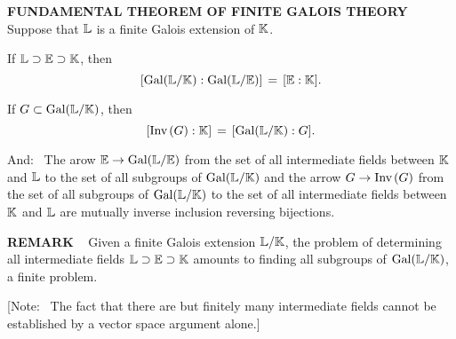 \begin{x}{\small\bf FUNDAMENTAL THEOREM OF FINITE GALOIS THEORY}  \ %
Suppose that $\mathbb{L}$ is a finite Galois extension of $\mathbb{K}$.

\vspace{0.1cm}

\qquad \textbullet \quad If $\mathbb{L} \supset \mathbb{E} \supset \mathbb{K}$, then
\[
[\text{Gal}(\mathbb{L}/\mathbb{K}):\text{Gal}(\mathbb{L}/\mathbb{E})] \hspace{0.05cm} = \hspace{0.05cm}  [\mathbb{E}:\mathbb{K}].
\]
\vspace{0.1cm}

\qquad \textbullet \quad If $G \subset \text{Gal}(\mathbb{L}/\mathbb{K})$, then 
\[
[\text{Inv}\hspace{0.05cm}(G):\mathbb{K}] \hspace{0.05cm} = \hspace{0.05cm} [\text{Gal}(\mathbb{L}/\mathbb{K}):G].
\]

\vspace{0.1cm}

And: \ The arow $\mathbb{E} \rightarrow \text{Gal}(\mathbb{L}/\mathbb{E})$ from the set of all intermediate fields between $\mathbb{K}$ and $\mathbb{L}$ 
to the set of all subgroups of $\text{Gal}(\mathbb{L}/\mathbb{K})$ and the arrow $G \rightarrow \text{Inv}\hspace{0.05cm}(G)$ from the 
set of all subgroups of $\text{Gal}(\mathbb{L}/\mathbb{K})$ to the set of all intermediate fields between $\mathbb{K}$ and $\mathbb{L}$ 
are mutually inverse inclusion reversing bijections.
\end{x}

\vspace{0.1cm}

\begin{x}{\small\bf REMARK} \ %
Given a finite Galois extension $\mathbb{L}/\mathbb{K}$, the problem of determining all intermediate fields 
$\mathbb{L} \supset \mathbb{E} \supset \mathbb{K}$ amounts to finding all subgroups of $\text{Gal}(\mathbb{L}/\mathbb{K})$, a finite problem.

\vspace{0.1cm}

[Note: \ The fact that there are but finitely many intermediate fields cannot be established by a vector space argument alone.]

\end{x}

\vspace{0.1cm}

